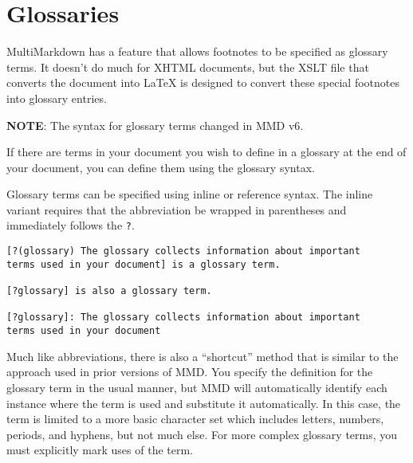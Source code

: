
\def\mytitle{Glossaries}
\def\myauthor{Fletcher T. Penney}
\def\revised{2018-06-27}




\tableofcontents

\section{Glossaries }
\label{glossaries}

MultiMarkdown has a feature that allows footnotes to be specified as glossary terms. It doesn't do much for XHTML documents, but the XSLT file that converts the document into LaTeX is designed to convert these special footnotes into glossary entries.

\textbf{NOTE}: The syntax for glossary terms changed in \gls{MMD} v6.

If there are terms in your document you wish to define in a \gls{glossary} at the end of your document, you can define them using the glossary syntax.

Glossary terms can be specified using inline or reference syntax. The inline variant requires that the abbreviation be wrapped in parentheses and immediately follows the \texttt{?}.

\begin{verbatim}
[?(glossary) The glossary collects information about important
terms used in your document] is a glossary term.

[?glossary] is also a glossary term.

[?glossary]: The glossary collects information about important
terms used in your document
\end{verbatim}

Much like abbreviations, there is also a ``shortcut'' method that is similar to the approach used in prior versions of \gls{MMD}. You specify the definition for the glossary term in the usual manner, but \gls{MMD} will automatically identify each instance where the term is used and substitute it automatically. In this case, the term is limited to a more basic character set which includes letters, numbers, periods, and hyphens, but not much else. For more complex glossary terms, you must explicitly mark uses of the term.


